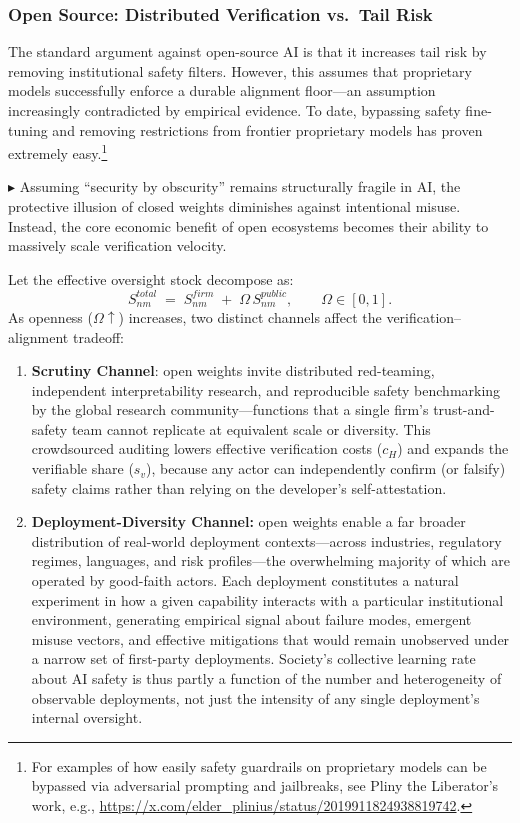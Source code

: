 \documentclass[12pt, letter]{article}
\begin{document}
\subsubsection{Open Source: Distributed Verification vs.\ Tail Risk}

The standard argument against open-source AI is that it increases tail risk by removing institutional safety filters. However, this assumes that proprietary models successfully enforce a durable alignment floor---an assumption increasingly contradicted by empirical evidence. To date, bypassing safety fine-tuning and removing restrictions from frontier proprietary models has proven extremely easy.\footnote{For examples of how easily safety guardrails on proprietary models can be bypassed via adversarial prompting and jailbreaks, see Pliny the Liberator's work, e.g., \url{https://x.com/elder_plinius/status/2019911824938819742}.} 

$\blacktriangleright$ Assuming ``security by obscurity'' remains structurally fragile in AI, the protective illusion of closed weights diminishes against intentional misuse. Instead, the core economic benefit of open ecosystems becomes their ability to massively scale verification velocity.

Let the effective oversight stock decompose as:
\[
S_{nm}^{total} \;=\; S_{nm}^{firm} \;+\; \Omega\,S_{nm}^{public}, \qquad \Omega\in[0,1].
\]
As openness ($\Omega\uparrow$) increases, two distinct channels affect the verification--alignment tradeoff:

\begin{enumerate}
    \item \textbf{Scrutiny Channel}: open weights invite distributed red-teaming, independent interpretability research, and reproducible safety benchmarking by the global research community---functions that a single firm's trust-and-safety team cannot replicate at equivalent scale or diversity. This crowdsourced auditing lowers effective verification costs ($c_H$) and expands the verifiable share ($s_v$), because any actor can independently confirm (or falsify) safety claims rather than relying on the developer's self-attestation.
    
    \item \textbf{Deployment-Diversity Channel:} open weights enable a far broader distribution of real-world deployment contexts---across industries, regulatory regimes, languages, and risk profiles---the overwhelming majority of which are operated by good-faith actors. Each deployment constitutes a natural experiment in how a given capability interacts with a particular institutional environment, generating empirical signal about failure modes, emergent misuse vectors, and effective mitigations that would remain unobserved under a narrow set of first-party deployments. Society's collective learning rate about AI safety is thus partly a function of the number and heterogeneity of observable deployments, not just the intensity of any single deployment's internal oversight.
\end{enumerate}
\end{document}
